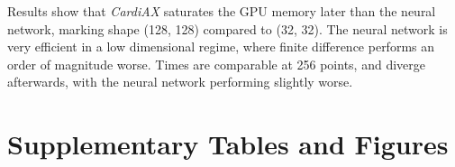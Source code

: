 \documentclass[utf8]{frontiers_suppmat} %
\begin{document}
Results show that \textit{CardiAX} saturates the GPU memory later than the neural network, marking shape (128, 128) compared to (32, 32).
The neural network is very efficient in a low dimensional regime, where finite difference performs an order of magnitude worse.
Times are comparable at 256 points, and  diverge afterwards, with the neural network performing slightly worse.


\section{Supplementary Tables and Figures}






\end{document}
